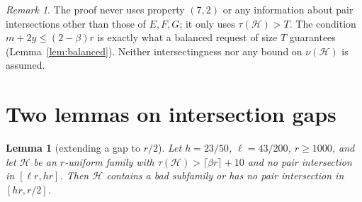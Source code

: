 \documentclass[11pt]{amsart}
\newtheorem{lemma}[theorem]{Lemma}
\theoremstyle{definition}
\theoremstyle{remark}
\newtheorem{remark}[theorem]{Remark}
\newcommand{\cH}{\mathcal H}
\newcommand{\ceil}[1]{\lceil #1\rceil}
\begin{document}
\begin{remark}
The proof never uses property $(7,2)$ or any information about pair intersections other than those of $E,F,G$; it only uses $\tau(\cH)>T$. The condition $m+2y\le(2-\beta)r$ is exactly what a balanced request of size $T$ guarantees (Lemma~\ref{lem:balanced}). Neither intersectingness nor any bound on $\nu(\cH)$ is assumed.
\end{remark}

\section{Two lemmas on intersection gaps}\label{sec:gap}

\begin{lemma}[extending a gap to $r/2$]\label{lem:gapext}
Let $h=23/50$, $\ell=43/200$, $r\ge1000$, and let $\cH$ be an $r$-uniform family with $\tau(\cH)>\ceil{\beta r}+10$ and no pair intersection in $[\ell r,hr]$. Then $\cH$ contains a bad subfamily or has no pair intersection in $[hr,r/2]$.
\end{lemma}
\end{document}
